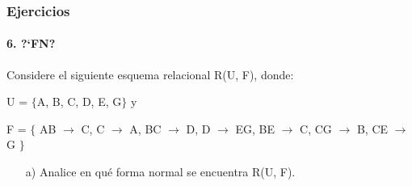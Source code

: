\begin{frame}
    \frametitle{Ejercicios}
    \framesubtitle{6. ?`FN?}

    Considere el siguiente esquema relacional R(U, F), donde:

    U = $\{$A, B, C, D, E, G$\}$ y

    F = $\{$ AB $\rightarrow$ C, C $\rightarrow$ A, BC $\rightarrow$ D, D $\rightarrow$ EG, BE $\rightarrow$ C, CG $\rightarrow$ B, CE $\rightarrow$ G $\}$

    \begin{enumerate}
        \item[a)] Analice en qu\'e forma normal se encuentra R(U, F).
    \end{enumerate}

\end{frame}

